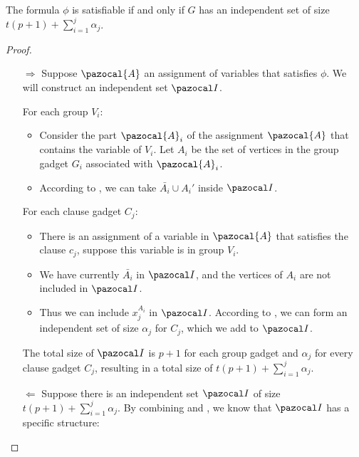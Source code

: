 \begin{lemma}
    \label{lemma:indset-sat-graph-equiv}
    The formula $\phi$ is satisfiable if and only if $G$ has an independent set of size $t(p+1) + \sum_{i = 1}^j \alpha_j$.
\end{lemma}

\begin{proof}
    \begin{itemize}
        \item [$\Rightarrow$] Suppose $\pazocal{A}$ an assignment of variables that satisfies $\phi$. We will construct an independent set $\I$.
        
        For each group $V_i$:
        \begin{itemize}
            \item Consider the part $\pazocal{A}_i$ of the assignment $\pazocal{A}$ that contains the variable of $V_i$. Let $A_i$ be the set of vertices in the group gadget $G_i$ associated with $\pazocal{A}_i$.
            \item According to , we can take $\bar{A_i} \cup A_i'$ inside $\I$.
        \end{itemize}
        For each clause gadget $C_j$:
        \begin{itemize}
            \item There is an assignment of a variable in $\pazocal{A}$ that satisfies the clause $c_j$, suppose this variable is in group $V_i$.
            \item We have currently $\bar{A_i}$ in $\I$, and the vertices of $A_i$ are not included in $\I$.
            \item Thus we can include $x_j^{A_i}$ in $\I$. According to , we can form an independent set of size $\alpha_j$ for $C_j$, which we add to $\I$.
        \end{itemize}
        
        \medskip

        The total size of $\I$ is $p+1$ for each group gadget and $\alpha_j$ for every clause gadget $C_j$, resulting in a total size of $t(p+1) + \sum_{i = 1}^j \alpha_j$.

        \item [$\Leftarrow$] Suppose there is an independent set $\I$ of size $t(p+1) + \sum_{i = 1}^j \alpha_j$. By combining  and , we know that $\I$ has a specific structure:
        

\end{itemize}
\end{proof}
